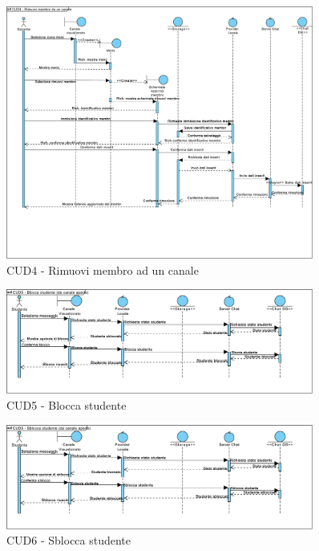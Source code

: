 \begin{figure}
	\centering
	\includegraphics[width=0.9\textwidth]{imgs/gruppo6/sequence/CUD4_rimuovi_membro_ad_un_canale.pdf}
	\caption{CUD4 - Rimuovi membro ad un canale}
	\label{fig:seq-cud4}
\end{figure}

\begin{figure}
	\centering
	\includegraphics[width=0.9\textwidth]{imgs/gruppo6/sequence/CUD5_blocca_studente.pdf}
	\caption{CUD5 - Blocca studente}
	\label{fig:seq-cud5}
\end{figure}

\begin{figure}
	\centering
	\includegraphics[width=0.9\textwidth]{imgs/gruppo6/sequence/CUD6_sblocca_studente.pdf}
	\caption{CUD6 - Sblocca studente}
	\label{fig:seq-cud6}
\end{figure}


